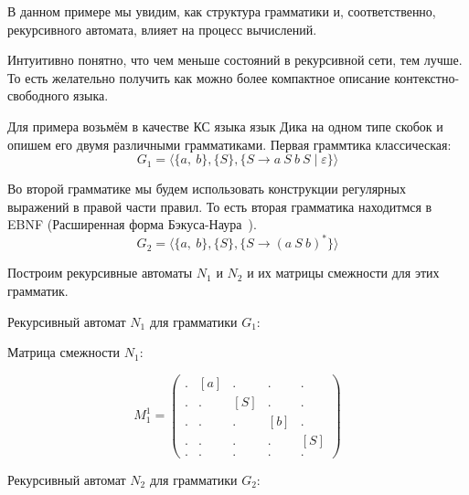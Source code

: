 \begin{example}

В данном примере мы увидим, как структура грамматики и, соответственно, рекурсивного автомата, влияет на процесс вычислений.

Интуитивно понятно, что чем меньше состояний в рекурсивной сети, тем лучше.
То есть желательно получить как можно более компактное описание контекстно-свободного языка.

Для примера возьмём в качестве КС языка язык Дика на одном типе скобок и опишем его двумя различными грамматиками.
Первая граммтика классическая:
$$
G_1 = \langle \{a,\ b\}, \{ S \}, \{S \to a \ S \ b \ S \mid \varepsilon  \} \rangle
$$

Во второй грамматике мы будем использовать конструкции регулярных выражений в правой части правил.
То есть вторая грамматика находитмся в EBNF (Расширенная форма Бэкуса-Наура~\cite{Hemerik2009, Wirth1977}).
$$
G_2 = \langle \{a, \ b\}, \{S\}, \{S \to (a \ S \ b)^{*}\} \rangle
$$

Построим рекурсивные автоматы $N_1$ и $N_2$ и их матрицы смежности для этих грамматик.

Рекурсивный автомат $N_1$ для грамматики $G_1$:
\begin{center}
\end{center}

Матрица смежности $N_1$:

$$
M_1^1 =
\begin{pmatrix}
. & [a] & .   & .   & .  \\
. & .   & [S] & .   & .  \\
. & .   & .   & [b] & .  \\
. & .   & .   & .   & [S] \\
. & .   & .   & .   & .
\end{pmatrix}
$$


Рекурсивный автомат $N_2$ для грамматики $G_2$:
\begin{center}
  
\end{center}


\end{example}
